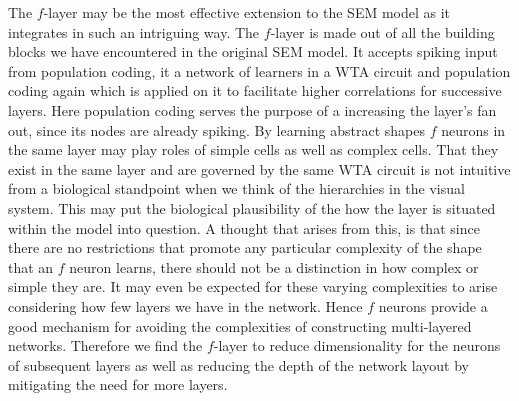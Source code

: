 \documentclass{report}
\begin{document}
The $f$-layer may be the most effective extension to the SEM model as it integrates in such an intriguing way. The $f$-layer is made out of all the building blocks we have encountered in the original SEM model. It accepts spiking input from population coding, it a network of learners in a WTA circuit and population coding again which is applied on it to facilitate higher correlations for successive layers. Here population coding serves the purpose of a increasing the layer's fan out, since its nodes are already spiking. By learning abstract shapes $f$ neurons in the same layer may play roles of simple cells as well as complex cells. That they exist in the same layer and are governed by the same WTA circuit is not intuitive from a biological standpoint when we think of the hierarchies in the visual system. This may put the biological plausibility of the how the layer is situated within the model into question. A thought that arises from this, is that since there are no restrictions that promote any particular complexity of the shape that an $f$ neuron learns, there should not be a distinction in how complex or simple they are. It may even be expected for these varying complexities to arise considering how few layers we have in the network. Hence $f$ neurons provide a good mechanism for avoiding the complexities of constructing multi-layered networks. Therefore we find the $f$-layer to reduce dimensionality for the neurons of subsequent layers as well as reducing the depth of the network layout by mitigating the need for more layers.
\end{document}
